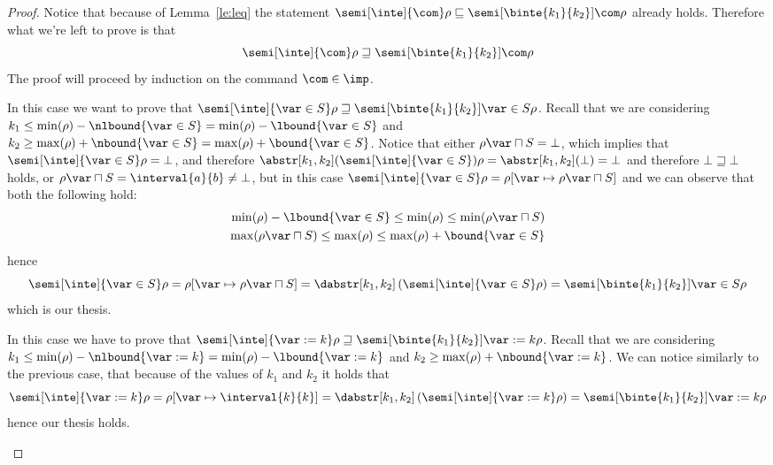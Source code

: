 \begin{proof}
  Notice that because of Lemma~\ref{le:leq} the statement
  \({\semi[\inte]{\com}\rho} \sqsubseteq
  {\semi[\binte{k_1}{k_2}]{\com}\rho}\) already holds. Therefore what
  we're left to prove is that
  \begin{equation*}
    \semi[\inte]{\com}\rho \sqsupseteq \semi[\binte{k_1}{k_2}]{\com}\rho
  \end{equation*}
  The proof will proceed by induction on the command \(\com\in\imp\).
  \begin{inductive}
     In this case we want to prove that
    \({\semi[\inte]{\var\in S}\rho \sqsupseteq
      \semi[\binte{k_1}{k_2}]{\var\in S}\rho}\). Recall that we are
    considering
    \({k_1 \leq \min(\rho) - \nlbound{\var\in S}} = {\min(\rho) -
      \lbound{\var\in S}}\) and
    \({k_2 \geq \max(\rho) + \nbound{\var\in S}} = {\max(\rho) +
      \bound{\var\in S}}\). Notice that either
    \(\rho\var \sqcap S = \bot\), which implies that
    \(\semi[\inte]{\var\in S}\rho = \bot\), and therefore
    \({\abstr[k_1,k_2](\semi[\inte]{\var\in S})\rho} =
    \abstr[k_1,k_2](\bot) = \bot\) and therefore
    \(\bot \sqsupseteq \bot\) holds, or
    \(\rho\var \sqcap S = \interval{a}{b} \neq \bot\), but in this
    case
    \({\semi[\inte]{\var\in S}\rho} = {\rho[\var \mapsto \rho\var
      \sqcap S]}\) and we can observe that both the following hold:
    \begin{align*}
      \min(\rho) - \lbound{\var\in S} \leq \min(\rho) \leq \min(\rho\var \sqcap S) \\
      \max(\rho\var \sqcap S) \leq \max(\rho) \leq \max(\rho) + \bound{\var\in S}
    \end{align*}
    hence
    \begin{equation*}
      \semi[\inte]{\var\in S}\rho = \rho[\var \mapsto \rho\var \sqcap S] = \dabstr[k_1,k_2]\left(\semi[\inte]{\var\in S}\rho\right) = \semi[\binte{k_1}{k_2}]{\var\in S}\rho
    \end{equation*}
    which is our thesis.
    
     In this case we have to prove that
    \(\semi[\inte]{\var := k}\rho \sqsupseteq
    \semi[\binte{k_1}{k_2}]{\var := k}\rho\). Recall that we are
    considering
    \({k_1 \leq \min(\rho) - \nlbound{\var := k}} = {\min(\rho) -
      \lbound{\var := k}}\) and
    \({k_2 \geq \max(\rho) + \nbound{\var := k}}\).  We can notice
    similarly to the previous case, that because of the values of
    \(k_1\) and \(k_2\) it holds that
    \begin{equation*}
      \semi[\inte]{\var := k}\rho = \rho[\var \mapsto \interval{k}{k}] = \dabstr[k_1,k_2]\left(\semi[\inte]{\var := k}\rho\right) = \semi[\binte{k_1}{k_2}]{\var := k}\rho
    \end{equation*}
    hence our thesis holds.
    

\end{inductive}
\end{proof}
